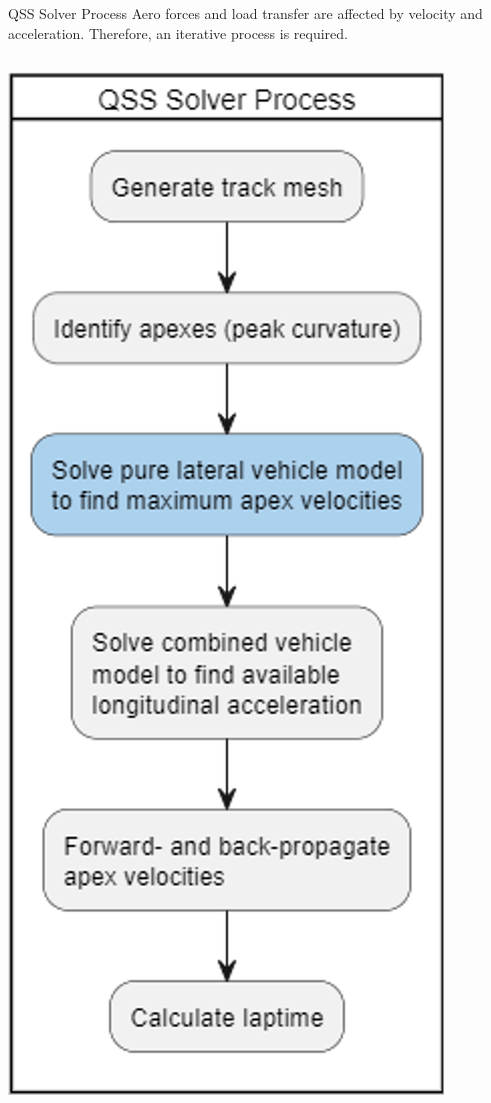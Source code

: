 \begin{frame}{QSS Solver Process}
    Aero forces and load transfer are affected by velocity and acceleration.
    Therefore, an iterative process is required.
    \vspace{2ex}
    \begin{columns}
        \includegraphics[width=\textwidth]{res/QSS Solver Process.png} \\

\end{columns}
\end{frame}
